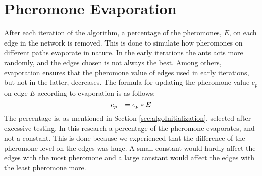 \section{Pheromone Evaporation}

After each iteration of the algorithm, a percentage of the pheromones, $E$, on each edge in the network is removed. This is done to simulate how pheromones on different paths evaporate in nature. In the early iterations the ants acts more randomly, and the edges chosen is not always the best. Among others, evaporation ensures that the pheromone value of edges used in early iterations, but not in the latter, decreases. The formula for updating the pheromone value $e_p$ on edge $E$ according to evaporation is as follows: 
\newline
$$e_p \mathrel{-}= e_p*E$$
\newline
The percentage is, as mentioned in Section \vref{sec:algoInitialization}, selected after excessive testing. In this research a percentage of the pheromone evaporates, and not a constant. This is done because we experienced that the difference of the pheromone level on the edges was huge. A small constant would hardly affect the edges with the most pheromone and a large constant would affect the edges with the least pheromone more. 